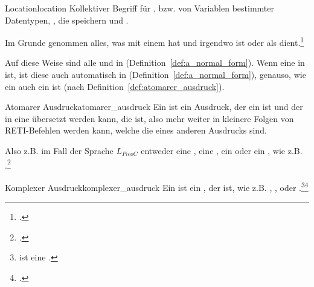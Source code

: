 \begin{Definition}{Location}{location}
  Kollektiver Begriff für ,  bzw.  von Variablen bestimmter Datentypen, , die  speichern und .

  Im Grunde genommen alles, was mit einem  hat und irgendwo  ist oder als  dient.\footcite{g_siek_course_2022}
\end{Definition}

Auf diese Weise sind alle  und  in  (Definition~\ref{def:a_normal_form}). Wenn eine  in  ist, ist diese auch automatisch in  (Definition~\ref{def:a_normal_form}), genauso, wie ein  auch ein  ist (nach Definition~\ref{def:atomarer_ausdruck}).


\begin{Definition}{Atomarer Ausdruck}{atomarer_ausdruck}
  Ein  ist ein Ausdruck, der ein  ist und der in eine  übersetzt werden kann, die  ist, also  mehr weiter in kleinere Folgen von RETI-Befehlen  werden kann, welche die  eines anderen Ausdrucks sind.

  Also z.B. im Fall der Sprache $L_{PicoC}$ entweder eine  , eine  , ein   oder ein , wie z.B. .\footcite{g_siek_course_2022}
\end{Definition}

\begin{Definition}{Komplexer Ausdruck}{komplexer_ausdruck}
  Ein  ist ein , der  ist, wie z.B. , ,  oder .\footnote{ ist eine  .}\footcite{g_siek_course_2022}
\end{Definition}

